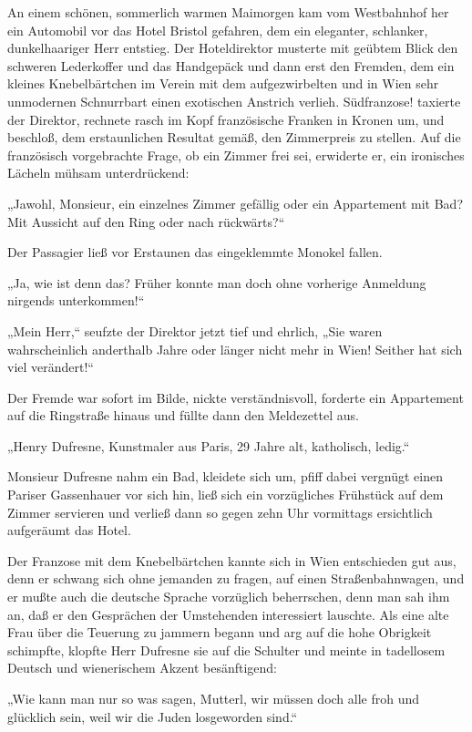\tb{* * *}
An einem schönen, sommerlich warmen Maimorgen kam vom Westbahnhof
her ein Automobil vor das Hotel Bristol gefahren, dem ein
eleganter, schlanker, dunkelhaariger Herr entstieg. Der
Hoteldirektor musterte mit geübtem Blick den schweren Lederkoffer
und das Handgepäck und dann erst den Fremden, dem ein kleines
Knebelbärtchen im Verein mit dem aufgezwirbelten und in Wien sehr
unmodernen Schnurrbart einen exotischen Anstrich verlieh.
Südfranzose! taxierte der Direktor, rechnete rasch im Kopf
französische Franken in Kronen um, und beschloß, dem erstaunlichen
Resultat gemäß, den Zimmerpreis zu  stellen. Auf die
französisch vorgebrachte Frage, ob ein Zimmer frei sei, erwiderte
er, ein ironisches Lächeln mühsam unterdrückend:

„Jawohl, Monsieur, ein einzelnes Zimmer gefällig oder ein
Appartement mit Bad? Mit Aussicht auf den Ring oder nach
rückwärts?“

Der Passagier ließ vor Erstaunen das eingeklemmte Monokel fallen.

„Ja, wie ist denn das? Früher konnte man doch ohne vorherige
Anmeldung nirgends unterkommen!“

„Mein Herr,“ seufzte der Direktor jetzt tief und ehrlich, „Sie
waren wahrscheinlich anderthalb Jahre oder länger nicht mehr in
Wien! Seither hat sich viel verändert!“

Der Fremde war sofort im Bilde, nickte verständnisvoll, forderte
ein Appartement auf die Ringstraße hinaus und füllte dann den
Meldezettel aus.

„Henry Dufresne, Kunstmaler aus Paris, 29 Jahre alt, katholisch,
ledig.“

Monsieur Dufresne nahm ein Bad, kleidete sich um, pfiff dabei
vergnügt einen Pariser Gassenhauer vor sich hin, ließ sich ein
vorzügliches Frühstück auf dem Zimmer servieren und verließ dann so
gegen zehn Uhr vormittags ersichtlich aufgeräumt das Hotel.

Der Franzose mit dem Knebelbärtchen kannte sich in Wien entschieden
gut aus, denn er schwang sich ohne jemanden zu fragen, auf einen
Straßenbahnwagen, und er mußte auch die deutsche Sprache vorzüglich
beherrschen, denn man sah ihm an, daß er den Gesprächen der
Umstehenden interessiert lauschte. Als eine alte Frau über die
Teuerung zu  jammern begann und arg auf die hohe
Obrigkeit schimpfte, klopfte Herr Dufresne sie auf die Schulter und
meinte in tadellosem Deutsch und wienerischem Akzent besänftigend:

„Wie kann man nur so was sagen, Mutterl, wir müssen doch alle froh
und glücklich sein, weil wir die Juden losgeworden sind.“

